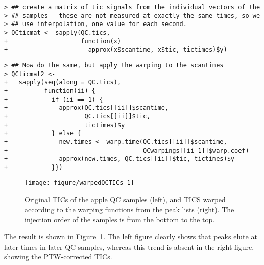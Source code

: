 \documentclass[a4paper,11pt]{article}\usepackage[]{graphicx}\usepackage[]{color}
\makeatletter
\newenvironment{kframe}{%
 \def\at@end@of@kframe{}%
 \ifinner\ifhmode%
  \def\at@end@of@kframe{\end{minipage}}%
  \begin{minipage}{\columnwidth}%
 \fi\fi%
 \def\FrameCommand##1{\hskip\@totalleftmargin \hskip-\fboxsep
 \colorbox{shadecolor}{##1}\hskip-\fboxsep
     \hskip-\linewidth \hskip-\@totalleftmargin \hskip\columnwidth}%
 \MakeFramed {\advance\hsize-\width
   \@totalleftmargin\z@ \linewidth\hsize
   \@setminipage}}%
 {\par\unskip\endMakeFramed%
 \at@end@of@kframe}
\newenvironment{knitrout}{}{} %
\makeatother
\begin{document}
\begin{knitrout}\small
{}\color{fgcolor}\begin{kframe}
\begin{verbatim}
> ## create a matrix of tic signals from the individual vectors of the
> ## samples - these are not measured at exactly the same times, so we
> ## use interpolation, one value for each second.
> QCticmat <- sapply(QC.tics, 
+                    function(x) 
+                      approx(x$scantime, x$tic, tictimes)$y)
\end{verbatim}
\end{kframe}
\end{knitrout}
\begin{knitrout}\small
{}\color{fgcolor}\begin{kframe}
\begin{verbatim}
> ## Now do the same, but apply the warping to the scantimes
> QCticmat2 <- 
+   sapply(seq(along = QC.tics),
+          function(ii) {
+            if (ii == 1) {
+              approx(QC.tics[[ii]]$scantime, 
+                     QC.tics[[ii]]$tic, 
+                     tictimes)$y
+            } else {
+              new.times <- warp.time(QC.tics[[ii]]$scantime, 
+                                     QCwarpings[[ii-1]]$warp.coef)
+              approx(new.times, QC.tics[[ii]]$tic, tictimes)$y
+            }})
\end{verbatim}
\end{kframe}
\end{knitrout}

\begin{figure}[tb]
  \centering
\begin{knitrout}\small
{}\color{fgcolor}
\texttt{[image: figure/warpedQCTICs-1]} 
\end{knitrout}
\caption{Original TICs of the apple QC samples (left), and TICS warped
  according to the warping functions from the peak lists
  (right). The injection order of the samples is from the bottom to
  the top.}
\label{fig:warpedQCTICs}
\end{figure}

\noindent
The result is shown in Figure~\ref{fig:warpedQCTICs}. The left figure
clearly shows that peaks elute at later times in later QC samples,
whereas this trend is absent in the right figure, showing the
PTW-corrected TICs.
\end{document}

